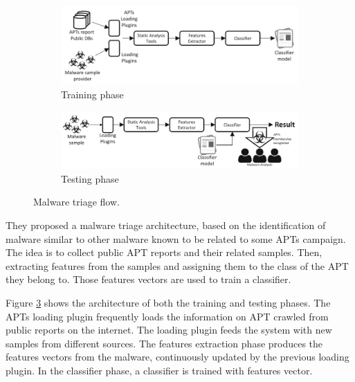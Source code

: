 \begin{figure}
	\centering
	\begin{subfigure}{1.0\textwidth}
		\centering		\includegraphics[width=1.0\linewidth]{train.png}  
		\caption{Training phase}
		\label{fig:sub-train}
	\end{subfigure}
	
	\begin{subfigure}{1.0\textwidth}
		\centering
		\includegraphics[width=1.0\linewidth]{test.png}  
		\caption{Testing phase}
		\label{fig:sub-test}
	\end{subfigure}
	
	\caption{Malware triage flow.}
	\label{fig:mal_triage}
\end{figure}

They proposed a malware triage architecture, based on the identification of malware similar to other malware known to be related to some APTs campaign. The idea is to collect public APT reports and their related samples.  Then, extracting features from the samples and assigning them to the class of the APT they belong to. Those features vectors are used to train a classifier.



Figure \ref{fig:mal_triage} shows the architecture of both the training and testing phases. The APTs loading plugin frequently loads the information on APT crawled from public reports on the internet. The loading plugin feeds the system with new samples from different sources. The features extraction phase produces the features vectors from the malware, continuously updated by the previous loading plugin. In the classifier phase, a classifier is trained with features vector. 

